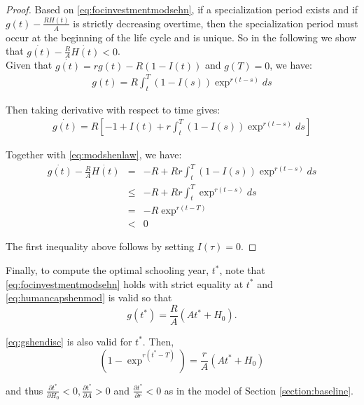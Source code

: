 \begin{proof}
Based on \eqref{eq:focinvestmentmodsehn}, if a specialization period exists and if $g(t) - \frac{RH(t)}{A}$ is strictly decreasing overtime, then the specialization period must occur at the beginning of the life cycle and is unique. So in the following we show that $\dot{g(t)} - \frac{R}{A}\dot{H(t)} < 0$.\\

\indent Given that $\dot{g(t)} = rg(t) - R(1-I(t))$ and $g(T)=0$, we have:
\begin{eqnarray}
g(t) = R \int_t^T (1-I(s)) \exp^{r(t-s)} ds \label{eq:gshendisc}
\end{eqnarray}

\indent Then taking derivative with respect to time gives:
\begin{eqnarray}
\dot{g(t)} = R \left[ -1 + I(t) + r\int_t^T (1-I(s)) \exp^{r(t-s)} ds \right] 
\end{eqnarray}

Together with \eqref{eq:modshenlaw}, we have:
\begin{eqnarray}
\dot{g(t)} - \frac{R}{A} \dot{H(t)} &=& -R + Rr\int_t^T (1-I(s)) \exp^{r(t-s)} ds\\
&\leq & -R + Rr\int_t^T \exp^{r(t-s)} ds \\
&=& -R\exp^{r(t-T)} \\
&<& 0  
\end{eqnarray}

\noindent The first inequality above follows by setting $I(\tau)=0$.
\end{proof}

\indent Finally, to compute the optimal schooling year, $t^*$, note that \eqref{eq:focinvestmentmodsehn} holds with strict equality at $t^*$ and \eqref{eq:humancapshenmod} is valid so that
\begin{equation}
g(t^*) = \frac{R}{A} \left( A t^* + H_{0} \right). 
\end{equation}

\noindent \eqref{eq:gshendisc} is also valid for $t^*$. Then,
\begin{equation}
\left( 1 - \exp^{r(t^*-T)} \right) = \frac{r}{A} \left( A t^* + H_{0} \right)
\end{equation}

\noindent and thus $\frac{\partial t^*}{\partial H_{0}} < 0, \frac{\partial t^*}{\partial A}> 0$ and $\frac{\partial t^*}{\partial r} < 0$ as in the model of Section \ref{section:baseline}. 
 
